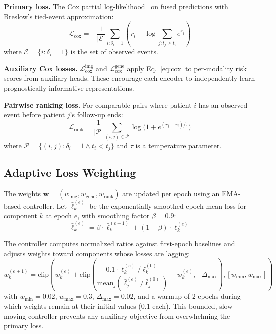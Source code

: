 \documentclass[10pt,twocolumn]{article}
\begin{document}
\textbf{Primary loss.} The Cox partial log-likelihood~\cite{cox1972}
on fused predictions with Breslow's tied-event approximation:
\begin{equation}
\mathcal{L}_{\text{cox}} = -\frac{1}{|\mathcal{E}|}
\sum_{i: \delta_i = 1}
\left( r_i - \log \sum_{j: t_j \geq t_i} e^{r_j} \right)
\label{eq:cox}
\end{equation}
where $\mathcal{E} = \{i : \delta_i = 1\}$ is the set of observed events.

\textbf{Auxiliary Cox losses.}
$\mathcal{L}_{\text{cox}}^{\text{img}}$ and
$\mathcal{L}_{\text{cox}}^{\text{gene}}$ apply Eq.~\ref{eq:cox} to
per-modality risk scores from auxiliary heads. These encourage each
encoder to independently learn prognostically informative
representations.

\textbf{Pairwise ranking loss.}
For comparable pairs where patient $i$ has an observed event before
patient $j$'s follow-up ends:
\begin{equation}
\mathcal{L}_{\text{rank}} = \frac{1}{|\mathcal{P}|}
\sum_{(i,j) \in \mathcal{P}}
\log\bigl(1 + e^{(r_j - r_i)/\tau}\bigr)
\label{eq:rank}
\end{equation}
where $\mathcal{P} = \{(i,j) : \delta_i = 1 \land t_i < t_j\}$ and
$\tau$ is a temperature parameter.

\subsection{Adaptive Loss Weighting}

The weights $\mathbf{w} = (w_{\text{img}}, w_{\text{gene}},
w_{\text{rank}})$ are updated per epoch using an EMA-based controller.
Let $\bar{\ell}_k^{(e)}$ be the exponentially smoothed epoch-mean loss
for component $k$ at epoch $e$, with smoothing factor $\beta = 0.9$:
\begin{equation}
\bar{\ell}_k^{(e)} = \beta \cdot \bar{\ell}_k^{(e-1)} + (1 - \beta) \cdot \ell_k^{(e)}
\end{equation}

The controller computes normalized ratios against first-epoch baselines
and adjusts weights toward components whose losses are lagging:
\begin{equation}
w_k^{(e+1)} = \text{clip}\!\left(
w_k^{(e)} + \text{clip}\!\left(
\frac{0.1 \cdot \bar{\ell}_k^{(e)} / \bar{\ell}_k^{(0)}}
{\text{mean}_j(\bar{\ell}_j^{(e)} / \bar{\ell}_j^{(0)})} - w_k^{(e)},
\pm \Delta_{\max}
\right),
[w_{\min}, w_{\max}]
\right)
\label{eq:weight_update}
\end{equation}
with $w_{\min}\!=\!0.02$, $w_{\max}\!=\!0.3$,
$\Delta_{\max}\!=\!0.02$, and a warmup of 2 epochs during which
weights remain at their initial values (0.1 each). This bounded,
slow-moving controller prevents any auxiliary objective from
overwhelming the primary loss.
\end{document}
